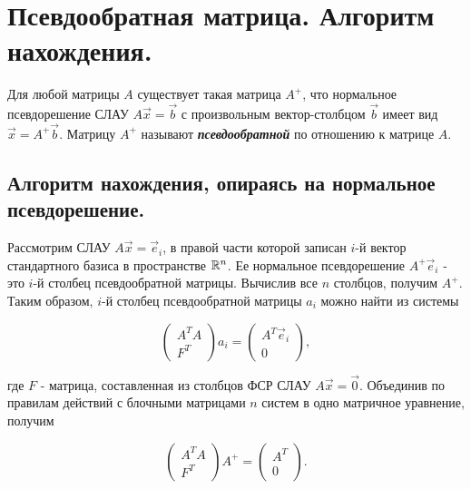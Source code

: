 \section{
    Псевдообратная матрица. Алгоритм нахождения.
}

\begin{definition}
    Для любой матрицы $A$ существует такая матрица $A^+$, что нормальное псевдорешение СЛАУ $A\vec{x} = \vec{b}$ с произвольным вектор-столбцом $\vec{b}$ имеет вид $\vec{x} = A^+\vec{b}$. Матрицу $A^+$ называют \textit{\textbf{псевдообратной}} по отношению к матрице $A$.
\end{definition}

\subsection{
    Алгоритм нахождения, опираясь на нормальное псевдорешение.
}

Рассмотрим СЛАУ $A\vec{x} = \vec{e}_i$, в правой части которой записан $i$-й вектор стандартного базиса в пространстве $\mathbb{R}^n$. Ее нормальное псевдорешение $A^+\vec{e}_i$ - это $i$-й столбец псевдообратной матрицы. Вычислив все $n$ столбцов, получим $A^+$. Таким образом, $i$-й столбец псевдообратной матрицы $a_i$ можно найти из системы

\begin{equation*}
    \left(\begin{array}{c}
        A^TA \\
        F^T
    \end{array}\right)a_i
    =
    \left(\begin{array}{c}
        A^T\vec{e}_i \\
        0
    \end{array}\right)
,\end{equation*}

где $F$ - матрица, составленная из столбцов ФСР СЛАУ $A\vec{x} = \vec{0}$. Объединив по правилам действий с блочными матрицами $n$ систем в одно матричное уравнение, получим

\begin{equation*}
    \left(\begin{array}{c}
        A^TA \\
        F^T
    \end{array}\right)A^+
    =
    \left(\begin{array}{c}
        A^T \\
        0
    \end{array}\right)
.\end{equation*}

